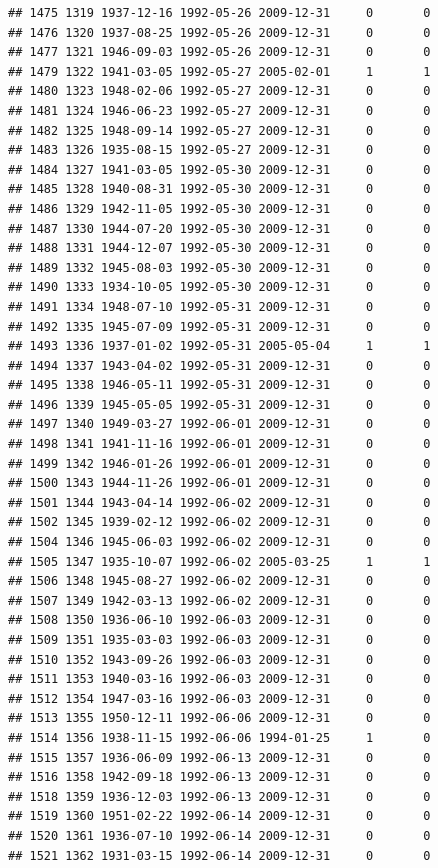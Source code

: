 \documentclass[
]{book}
\theoremstyle{definition}
\theoremstyle{definition}
\theoremstyle{definition}
\theoremstyle{definition}
\theoremstyle{remark}
\begin{document}
\begin{verbatim}
## 1475 1319 1937-12-16 1992-05-26 2009-12-31     0       0
## 1476 1320 1937-08-25 1992-05-26 2009-12-31     0       0
## 1477 1321 1946-09-03 1992-05-26 2009-12-31     0       0
## 1479 1322 1941-03-05 1992-05-27 2005-02-01     1       1
## 1480 1323 1948-02-06 1992-05-27 2009-12-31     0       0
## 1481 1324 1946-06-23 1992-05-27 2009-12-31     0       0
## 1482 1325 1948-09-14 1992-05-27 2009-12-31     0       0
## 1483 1326 1935-08-15 1992-05-27 2009-12-31     0       0
## 1484 1327 1941-03-05 1992-05-30 2009-12-31     0       0
## 1485 1328 1940-08-31 1992-05-30 2009-12-31     0       0
## 1486 1329 1942-11-05 1992-05-30 2009-12-31     0       0
## 1487 1330 1944-07-20 1992-05-30 2009-12-31     0       0
## 1488 1331 1944-12-07 1992-05-30 2009-12-31     0       0
## 1489 1332 1945-08-03 1992-05-30 2009-12-31     0       0
## 1490 1333 1934-10-05 1992-05-30 2009-12-31     0       0
## 1491 1334 1948-07-10 1992-05-31 2009-12-31     0       0
## 1492 1335 1945-07-09 1992-05-31 2009-12-31     0       0
## 1493 1336 1937-01-02 1992-05-31 2005-05-04     1       1
## 1494 1337 1943-04-02 1992-05-31 2009-12-31     0       0
## 1495 1338 1946-05-11 1992-05-31 2009-12-31     0       0
## 1496 1339 1945-05-05 1992-05-31 2009-12-31     0       0
## 1497 1340 1949-03-27 1992-06-01 2009-12-31     0       0
## 1498 1341 1941-11-16 1992-06-01 2009-12-31     0       0
## 1499 1342 1946-01-26 1992-06-01 2009-12-31     0       0
## 1500 1343 1944-11-26 1992-06-01 2009-12-31     0       0
## 1501 1344 1943-04-14 1992-06-02 2009-12-31     0       0
## 1502 1345 1939-02-12 1992-06-02 2009-12-31     0       0
## 1504 1346 1945-06-03 1992-06-02 2009-12-31     0       0
## 1505 1347 1935-10-07 1992-06-02 2005-03-25     1       1
## 1506 1348 1945-08-27 1992-06-02 2009-12-31     0       0
## 1507 1349 1942-03-13 1992-06-02 2009-12-31     0       0
## 1508 1350 1936-06-10 1992-06-03 2009-12-31     0       0
## 1509 1351 1935-03-03 1992-06-03 2009-12-31     0       0
## 1510 1352 1943-09-26 1992-06-03 2009-12-31     0       0
## 1511 1353 1940-03-16 1992-06-03 2009-12-31     0       0
## 1512 1354 1947-03-16 1992-06-03 2009-12-31     0       0
## 1513 1355 1950-12-11 1992-06-06 2009-12-31     0       0
## 1514 1356 1938-11-15 1992-06-06 1994-01-25     1       0
## 1515 1357 1936-06-09 1992-06-13 2009-12-31     0       0
## 1516 1358 1942-09-18 1992-06-13 2009-12-31     0       0
## 1518 1359 1936-12-03 1992-06-13 2009-12-31     0       0
## 1519 1360 1951-02-22 1992-06-14 2009-12-31     0       0
## 1520 1361 1936-07-10 1992-06-14 2009-12-31     0       0
## 1521 1362 1931-03-15 1992-06-14 2009-12-31     0       0

\end{verbatim}
\end{document}
